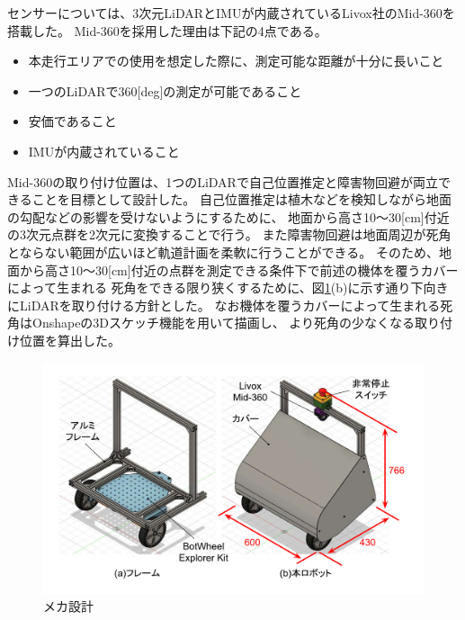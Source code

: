 \documentclass[twocolumn,9pt]{jsproceedings}
\begin{document}
センサーについては、3次元LiDARとIMUが内蔵されているLivox社のMid-360を搭載した。
Mid-360を採用した理由は下記の4点である。

\begin{itemize}
  \item[1] 本走行エリアでの使用を想定した際に、測定可能な距離が十分に長いこと
  \item[2] 一つのLiDARで360[deg]の測定が可能であること
  \item[3] 安価であること
  \item[4] IMUが内蔵されていること
\end{itemize}

Mid-360の取り付け位置は、1つのLiDARで自己位置推定と障害物回避が両立できることを目標として設計した。
自己位置推定は植木などを検知しながら地面の勾配などの影響を受けないようにするために、
地面から高さ10〜30[cm]付近の3次元点群を2次元に変換することで行う。
また障害物回避は地面周辺が死角とならない範囲が広いほど軌道計画を柔軟に行うことができる。
そのため、地面から高さ10〜30[cm]付近の点群を測定できる条件下で前述の機体を覆うカバーによって生まれる
死角をできる限り狭くするために、図\ref{fig:trainee_flame}(b)に示す通り下向きにLiDARを取り付ける方針とした。
なお機体を覆うカバーによって生まれる死角はOnshapeの3Dスケッチ機能を用いて描画し、
より死角の少なくなる取り付け位置を算出した。


\begin{figure}[h]
  \begin{center}
    \includegraphics[width=1.0\linewidth]{figs/robot_flame.pdf}
    \caption{メカ設計}
    \label{fig:trainee_flame}
  \end{center}
\end{figure}
\end{document}
